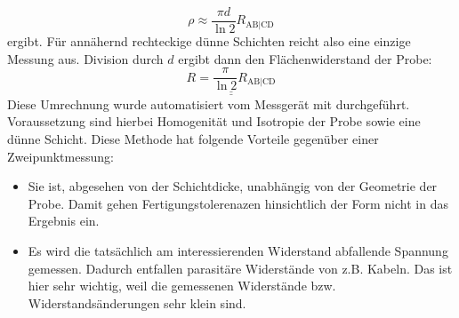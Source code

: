 \documentclass[german,  %
parskip=full,  %
]{scrartcl}
\begin{document}
\[\rho \approx \frac{\pi d}{\ln 2} R_{\mathrm{AB|CD}}\] 
ergibt. Für annähernd rechteckige dünne Schichten reicht also eine einzige Messung aus. Division durch \(d\) ergibt dann den Flächenwiderstand der Probe:
\[\underline{\underline{R = \frac{\pi }{\ln 2} R_{\mathrm{AB|CD}}}}\]
Diese Umrechnung wurde automatisiert vom Messgerät mit durchgeführt. Voraussetzung sind hierbei Homogenität und Isotropie der Probe sowie eine dünne Schicht. Diese Methode hat folgende Vorteile gegenüber einer Zweipunktmessung:
\begin{itemize}
\item Sie ist, abgesehen von der Schichtdicke, unabhängig von der Geometrie der Probe. Damit gehen Fertigungstolerenazen hinsichtlich der Form nicht in das Ergebnis ein.
\item Es wird die tatsächlich am interessierenden Widerstand abfallende Spannung gemessen. Dadurch entfallen parasitäre Widerstände von z.B. Kabeln. Das ist hier sehr wichtig, weil die gemessenen Widerstände bzw. Widerstandsänderungen sehr klein sind.
\end{itemize} 
\end{document}
